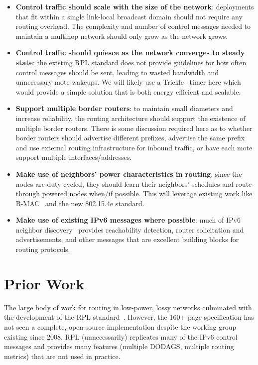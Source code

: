 \documentclass[10pt]{article}
\begin{document}
\begin{itemize}
    \item \textbf{Control traffic should scale with the size of the network}: deployments that fit within a single link-local broadcast domain should not require any routing overhead. The complexity and number of control messages needed to maintain a multihop network should only grow as the network grows.
    \item \textbf{Control traffic should quiesce as the network converges to steady state}: the existing RPL standard does not provide guidelines for how often control messages should be sent, leading to wasted bandwidth and unnecessary mote wakeups. We will likely use a Trickle~\cite{levis2011trickle} timer here which would provide a simple solution that is both energy efficient and scalable.
    \item \textbf{Support multiple border routers}: to maintain small diameters and increase reliability, the routing architecture should support the existence of multiple border routers. There is some discussion required here as to whether border routers should advertise different prefixes, advertise the same prefix and use external routing infrastructure for inbound traffic, or have each mote support multiple interfaces/addresses.
    \item \textbf{Make use of neighbors' power characteristics in routing}: since the nodes are duty-cycled, they should learn their neighbors' schedules and route through powered nodes when/if possible. This will leverage existing work like B-MAC~\cite{polastre2004versatile} and the new 802.15.4e standard.
    \item \textbf{Make use of existing IPv6 messages where possible}: much of IPv6 neighbor discovery~\cite{shelby2012neighbor, narten2007neighbor} provides reachability detection, router solicitation and advertisements, and other messages that are excellent building blocks for routing protocols.
\end{itemize}

\section{Prior Work}
The large body of work for routing in low-power, lossy networks culminated with the development of the RPL standard~\cite{winter2012rpl}. However, the 160+ page specification has not seen a complete, open-source implementation despite the working group existing since 2008. RPL (unnecessarily) replicates many of the IPv6 control messages and provides many features (multiple DODAGS, multiple routing metrics) that are not used in practice.
\end{document}
